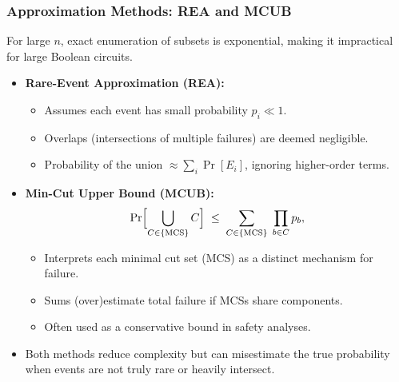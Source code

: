 \begin{frame}[allowframebreaks]
\frametitle{Approximation Methods: REA and MCUB}
 For large \(n\), exact enumeration of subsets is exponential, making it impractical for large Boolean circuits.
 \vspace{8pt}
\begin{itemize}
  \item \textbf{Rare-Event Approximation (REA):}
    \begin{itemize}
      \item Assumes each event has small probability \(p_i \ll 1\).
      \item Overlaps (intersections of multiple failures) are deemed negligible.
      \item Probability of the union \(\approx \sum_{i} \Pr[E_i]\), ignoring higher-order terms.
    \end{itemize}
\framebreak
  \item \textbf{Min-Cut Upper Bound (MCUB):}
    \begin{equation}
    \label{eq:mcub_slides}
      \Pr\Bigl[\bigcup_{C \in \{\mathrm{MCS}\}} C\Bigr]
      \;\le\;
      \sum_{C \in \{\mathrm{MCS}\}}
      \;\prod_{b \in C} p_b ,
    \end{equation}
    \begin{itemize}
      \item Interprets each minimal cut set (MCS) as a distinct mechanism for failure.
      \item Sums (over)estimate total failure if MCSs share components.
      \item Often used as a conservative bound in safety analyses.
    \end{itemize}
  \vspace{6pt}
  \item Both methods reduce complexity but can misestimate the true probability when events are not truly rare or heavily intersect.
\end{itemize}
\end{frame}



